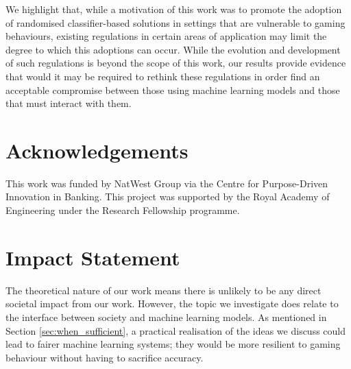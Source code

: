 We highlight that, while a motivation of this work was to promote the adoption of randomised classifier-based solutions in settings that are vulnerable to gaming behaviours, existing regulations in certain areas of application may limit the degree to which this adoptions can occur. While the evolution and development of such regulations is beyond the scope of this work, our results provide evidence that would it may be required to rethink these regulations in order find an acceptable compromise between those using machine learning models and those that must interact with them.

\section*{Acknowledgements}
This work was funded by NatWest Group via the Centre for Purpose-Driven Innovation in Banking. This project was supported by the Royal Academy of Engineering under the Research Fellowship programme.

\section*{Impact Statement}
The theoretical nature of our work means there is unlikely to be any direct societal impact from our work. However, the topic we investigate does relate to the interface between society and machine learning models. As mentioned in Section \ref{sec:when_sufficient}, a practical realisation of the ideas we discuss could lead to fairer machine learning systems; they would be more resilient to gaming behaviour without having to sacrifice accuracy.

